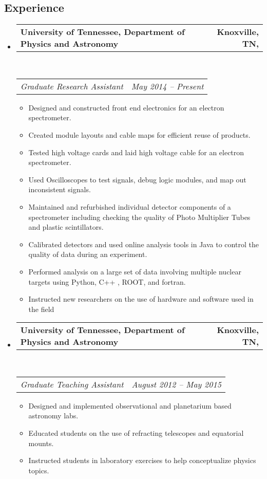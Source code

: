 \documentclass[12pt,letterpaper]{article}
\makeatletter
\newcommand{\headerrow}[2]
{\begin{tabular*}{\linewidth}{l@{\extracolsep{\fill}}r}
	#1 &
	#2 \\
\end{tabular*}}
\makeatother
\begin{document}
\subsection*{Experience}

\begin{itemize}
	\parskip=0.1em

	\item
	\headerrow
		{\textbf{University of Tennessee, Department of Physics and Astronomy }}
		{\textbf{  Knoxville, TN,}}
	\\
	\headerrow
		{\emph{Graduate Research Assistant }}
		{\emph{May 2014 -- Present}}
	\begin{itemize}
			\item Designed and constructed front end electronics for an electron spectrometer.
			\item Created module layouts and cable maps for efficient reuse of products.
			\item Tested high voltage cards and laid high voltage cable for an electron spectrometer.
			\item Used Oscilloscopes to test signals, debug logic modules, and map out inconsistent signals.  
			\item Maintained and refurbished individual detector components of a spectrometer including checking the quality of Photo Multiplier Tubes and plastic scintillators.
			\item Calibrated detectors and used online analysis tools in Java to control the quality of data during an experiment. 
			\item Performed analysis on a large set of data involving multiple nuclear targets using Python, C++ , ROOT, and fortran. 
			\item Instructed new researchers on the use of hardware and software used in the field
	\end{itemize}
	\vspace{1cm}
	\item
	\headerrow
		{\textbf{University of Tennessee, Department of Physics and Astronomy }}
		{\textbf{  Knoxville, TN,}}
	\\
	\headerrow
		{\emph{Graduate Teaching Assistant }}
		{\emph{August 2012 -- May 2015}}
	\begin{itemize}
		\item Designed and implemented observational and planetarium based astronomy labs.
		\item Educated students on the use of refracting telescopes and equatorial mounts.
		\item Instructed students in laboratory exercises to help conceptualize physics topics.

\end{itemize}
\end{itemize}
\end{document}
